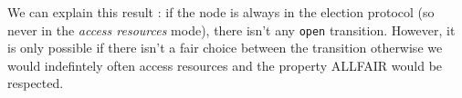 We can explain this result : if the node is always in the election protocol (so never in the \textit{access resources} mode), there isn't any \verb#open# transition. However, it is only possible if there isn't a fair choice between the transition otherwise we would indefintely often access resources and the property ALLFAIR would be respected.
